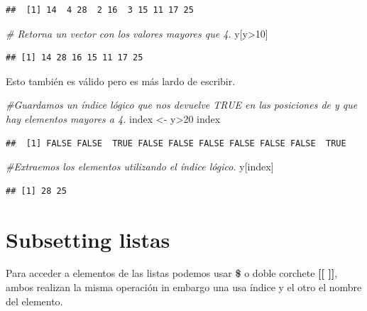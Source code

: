 \documentclass[
  12pt,
]{book}
\newenvironment{Shaded}{\begin{snugshade}}{\end{snugshade}}
\newcommand{\CommentTok}[1]{\textcolor[rgb]{0.56,0.35,0.01}{\textit{#1}}}
\newcommand{\DecValTok}[1]{\textcolor[rgb]{0.00,0.00,0.81}{#1}}
\newcommand{\NormalTok}[1]{#1}
\newcommand{\OtherTok}[1]{\textcolor[rgb]{0.56,0.35,0.01}{#1}}
\newcommand{\SpecialCharTok}[1]{\textcolor[rgb]{0.00,0.00,0.00}{#1}}
\begin{document}
\begin{verbatim}
##  [1] 14  4 28  2 16  3 15 11 17 25
\end{verbatim}

\begin{Shaded}
\begin{Highlighting}[]
\CommentTok{\# Retorna un vector con los valores mayores que 4.}
\NormalTok{y[y}\SpecialCharTok{\textgreater{}}\DecValTok{10}\NormalTok{]}
\end{Highlighting}
\end{Shaded}

\begin{verbatim}
## [1] 14 28 16 15 11 17 25
\end{verbatim}

Esto también es válido pero es más lardo de escribir.

\begin{Shaded}
\begin{Highlighting}[]
\CommentTok{\#Guardamos un índice lógico que nos devuelve TRUE en las posiciones de y que hay elementos mayores a 4.}
\NormalTok{index }\OtherTok{\textless{}{-}}\NormalTok{ y}\SpecialCharTok{\textgreater{}}\DecValTok{20}
\NormalTok{index}
\end{Highlighting}
\end{Shaded}

\begin{verbatim}
##  [1] FALSE FALSE  TRUE FALSE FALSE FALSE FALSE FALSE FALSE  TRUE
\end{verbatim}

\begin{Shaded}
\begin{Highlighting}[]
\CommentTok{\#Extraemos los elementos utilizando el índice lógico.}
\NormalTok{y[index]}
\end{Highlighting}
\end{Shaded}

\begin{verbatim}
## [1] 28 25
\end{verbatim}

\hypertarget{subsetting-listas}{%
\section{\texorpdfstring{\textbf{Subsetting listas}}{Subsetting listas}}\label{subsetting-listas}}

Para acceder a elementos de las listas podemos usar \textbf{\$} o doble corchete \textbf{{[}{[} {]}{]}}, ambos realizan la misma operación in embargo una usa índice y el otro el nombre del elemento.
\end{document}
